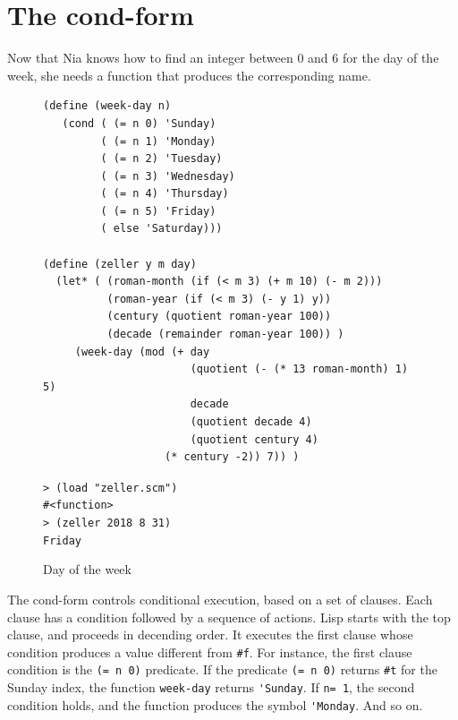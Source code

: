 \documentclass[a4paper,12pt]{book}
\newenvironment{fmpage}[1]
               {\begin{lrbox}{\fmbox}\begin{minipage}{#1}}
               {\end{minipage}\end{lrbox}\fbox{\usebox{\fmbox}}}
\begin{document}
\section{The cond-form}\label{page:cond-form}
Now that Nia knows how to find
an integer between 0 and 6 for the 
day of the week, she needs a function
that produces the corresponding name.


\begin{figure}[!h]
\begin{fmpage}{\linewidth}
\begin{verbatim}
(define (week-day n)
   (cond ( (= n 0) 'Sunday)
         ( (= n 1) 'Monday)
         ( (= n 2) 'Tuesday)
         ( (= n 3) 'Wednesday)
         ( (= n 4) 'Thursday)
         ( (= n 5) 'Friday)
         ( else 'Saturday)))

(define (zeller y m day)
  (let* ( (roman-month (if (< m 3) (+ m 10) (- m 2)))
          (roman-year (if (< m 3) (- y 1) y))
          (century (quotient roman-year 100))
          (decade (remainder roman-year 100)) )
     (week-day (mod (+ day
                       (quotient (- (* 13 roman-month) 1) 5)
                       decade
                       (quotient decade 4)
                       (quotient century 4)
	               (* century -2)) 7)) )

\end{verbatim}
\end{fmpage}

\begin{fmpage}{\linewidth}
  \verb|> (load "zeller.scm")|\\
  \verb|#<function>|\\
  \verb|> (zeller 2018 8 31)|\\
  \verb|Friday|
\end{fmpage}
\caption{Day of the week}
\label{fig:day-of-the-week}
\end{figure}

The cond-form controls conditional
execution, based on a set of clauses.
Each clause has a condition followed by
a sequence of actions.  Lisp starts with the
top clause, and proceeds in decending order.
It executes the first clause whose 
condition produces a value different from \verb|#f|.
For instance, the first clause condition is
the \verb|(= n 0)| predicate.
If the predicate \verb|(= n 0)| 
returns \verb|#t| for the Sunday index,
the function \verb|week-day| returns \verb|'Sunday|.
If \verb|n= 1|, the second condition holds,
and the function produces the symbol \verb|'Monday|.
And so on.
\end{document}
